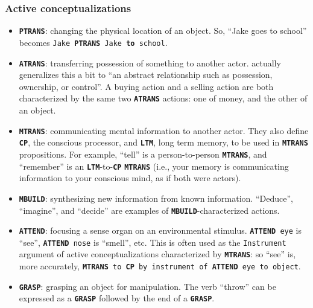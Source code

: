 \subsubsection{Active conceptualizations}
\label{sec:activeconc}
\begin{itemize}
    \item \texttt{\textbf{PTRANS}}: changing the physical location of an object. So, ``Jake goes to school'' becomes \texttt{Jake \textbf{PTRANS} Jake \textbf{to} school}.
    
    \item \texttt{\textbf{ATRANS}}: transferring possession of something to another actor. \citep{schankandabelson} actually generalizes this a bit to ``an abstract relationship such as possession, ownership, or control''. A buying action and a selling action are both characterized by the same two \texttt{\textbf{ATRANS}} actions: one of money, and the other of an object.
    
    \item \texttt{\textbf{MTRANS}}: communicating mental information to another actor. They also define \texttt{\textbf{CP}}, the conscious processor, and \texttt{\textbf{LTM}}, long term memory, to be used in \texttt{\textbf{MTRANS}} propositions. For example, ``tell'' is a person-to-person \texttt{\textbf{MTRANS}}, and ``remember'' is an \texttt{\textbf{LTM}}-to-\texttt{\textbf{CP}} \texttt{\textbf{MTRANS}} (i.e., your memory is communicating information to your conscious mind, as if both were actors).
    
    \item \texttt{\textbf{MBUILD}}: synthesizing new information from known information. ``Deduce'', ``imagine'', and ``decide'' are examples of \texttt{\textbf{MBUILD}}-characterized actions.
    
    \item \texttt{\textbf{ATTEND}}: focusing a sense organ on an environmental stimulus. \texttt{\textbf{ATTEND} eye} is ``see'', \texttt{\textbf{ATTEND} nose} is ``smell'', etc. This is often used as the \texttt{Instrument} argument of active conceptualizations characterized by \texttt{\textbf{MTRANS}}: so ``see'' is, more accurately, \texttt{\textbf{MTRANS} to \textbf{CP} by instrument of \textbf{ATTEND} eye to object}.
    
    \item \texttt{\textbf{GRASP}}: grasping an object for manipulation. The verb ``throw'' can be expressed as a \texttt{\textbf{GRASP}} followed by the end of a \texttt{\textbf{GRASP}}.
    

\end{itemize}
